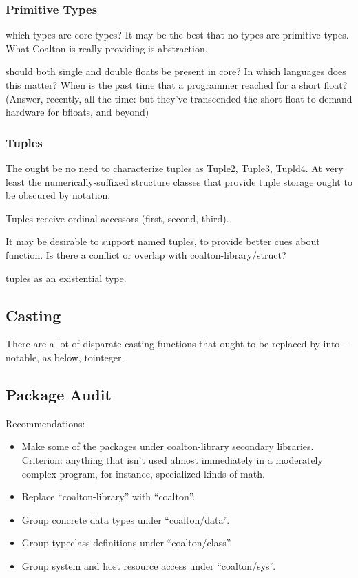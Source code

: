 \documentclass[12pt]{article}
\begin{document}
\subsubsection{Primitive Types}

which types are core types? It may be the best that no types are
primitive types. What Coalton is really providing is abstraction.

should both single and double floats be present in core? In which
languages does this matter? When is the past time that a programmer
reached for a short float? (Answer, recently, all the time: but
they've transcended the short float to demand hardware for bfloats,
and beyond)

\subsubsection{Tuples}

The ought be no need to characterize tuples as Tuple2, Tuple3,
Tupld4. At very least the numerically-suffixed structure classes that
provide tuple storage ought to be obscured by notation.

Tuples receive ordinal accessors (first, second, third).

It may be desirable to support named tuples, to provide better cues
about function.
Is there a conflict or overlap with coalton-library/struct?

tuples as an existential type.

\subsection{Casting}

There are a lot of disparate casting functions that ought to be
replaced by into -- notable, as below, tointeger.

\subsection{Package Audit}

Recommendations:

\begin{itemize}
\item Make some of the packages under coalton-library secondary
  libraries. Criterion: anything that isn't used almost immediately in
  a moderately complex program, for instance, specialized kinds of
  math.
\item Replace ``coalton-library'' with ``coalton''.
\item Group concrete data types under ``coalton/data''.
\item Group typeclass definitions under ``coalton/class''.
\item Group system and host resource access under ``coalton/sys''.
\end{itemize}
\end{document}
